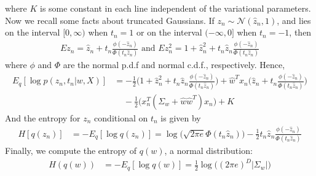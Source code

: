 \documentclass{article}
\begin{document}
where $K$ is some constant in each line independent of the variational parameters. Now we recall some facts about truncated Gaussians. If $z_n\sim \mathcal N(\hat z_n, 1)$, and lies on the interval $[0,\infty)$ when $t_n=1$ or on the interval $(-\infty, 0]$ when $t_n=-1$, then 
\begin{align}
Ez_n = \hat z_n + t_n\frac{\phi(-\hat z_n)}{\Phi(t_n\hat z_n)}
\text{ and }
Ez_n^2 = 1 + \hat z_n^2 + t_n\hat z_n \frac{\phi(-\hat z_n)}{\Phi(t_n\hat z_n)}
\end{align}
where $\phi$ and $\Phi$ are the normal p.d.f and normal c.d.f., respectively. Hence, %
\begin{align}
E_q[\log p(z_n,t_n|w,X)] 
	&= 
	-\frac{1}{2}\Big(1 + \hat z_n^2  + t_n\hat z_n \frac{\phi(-\hat z_n)}{\Phi(t_n\hat z_n)}\Big) 
	+ \hat w^Tx_n\Big(\hat z_n +t_n \frac{\phi(-\hat z_n)}{\Phi(t_n\hat z_n)}\Big) \\
	&~~~~~- \frac{1}{2} \Big(x_n^T(\Sigma_w + \hat w \hat w^T)x_n\Big) + K 
\end{align}
And the entropy for $z_n$ conditional on $t_n$ is given by %
\begin{align}
H[q(z_n)] &= - E_q[\log q(z_n)] 
	= \log\Big(\sqrt{2\pi e} \Phi(t_n\hat z_n)\Big) - \frac{1}{2}t_n\hat z_n\frac{ \phi(-\hat z_n)}{\Phi(t_n\hat z_n)}
\end{align}
Finally, we compute the entropy of $q(w)$, a normal distribution: 
\begin{align}
H(q(w)) &= -E_q[\log q(w) ] = \frac{1}{2}\log \big((2\pi e)^D |\Sigma_w|)
\end{align}

\end{document}
